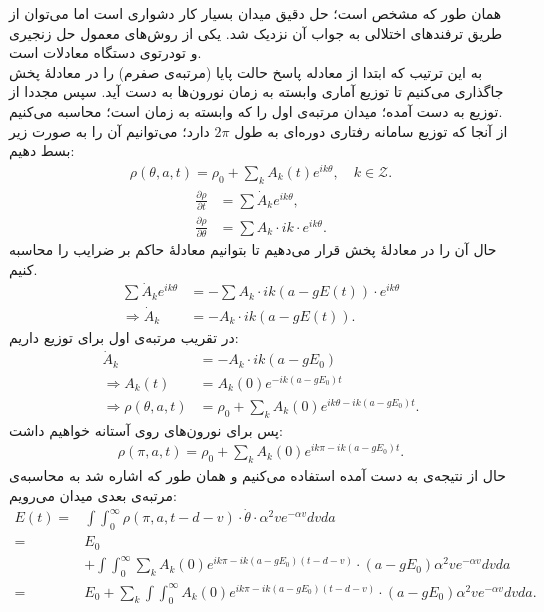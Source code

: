 همان طور که مشخص است؛ حل دقیق میدان بسیار کار دشواری است اما می‌توان از طریق ترفندهای اختلالی به جواب آن نزدیک شد. یکی از روش‌های معمول حل زنجیری و تودرتوی دستگاه معادلات است. \\
به این ترتیب که ابتدا از معادله  پاسخ حالت پایا (مرتبه‌ی صفرم) را در معادلهٔ پخش جاگذاری می‌کنیم تا توزیع آماری وابسته به زمان نورون‌ها به دست آید. سپس مجددا از توزیع به دست آمده؛ میدان مرتبه‌ی اول را که وابسته به زمان است؛ محاسبه می‌کنیم.\\
از آنجا که توزیع سامانه‌ رفتاری دوره‌ای به طول $2\pi$ دارد؛ می‌توانیم آن را به صورت زیر بسط دهیم:
\begin{align}
	\rho(\theta, a, t) = \rho_0 + \sum_k A_k(t) e^{ik\theta}, \quad k \in \mathcal{Z}.
\end{align}
\begin{align}
	\frac{\partial \rho}{\partial t} &= \sum \dot A_k e^{ik\theta} ,\\
	\frac{\partial \rho}{\partial \theta} &= \sum A_k \cdot ik \cdot e^{ik\theta}.
\end{align}
حال آن را در معادلهٔ پخش قرار می‌دهیم تا بتوانیم معادلهٔ حاکم بر ضرایب را محاسبه کنیم.
\begin{align}
	\sum \dot A_k e^{ik\theta} &= - \sum A_k \cdot ik(a - gE(t)) \cdot e^{ik\theta}\\
	\Rightarrow \dot A_k &= - A_k \cdot ik(a - gE(t)) .
\end{align}
در تقریب مرتبه‌ی اول برای توزیع داریم:
\begin{align}
	\dot A_k &= - A_k \cdot ik(a - g E_0)\\
	\Rightarrow A_k(t) &= A_k(0) e^{- ik(a-gE_0)t}\\
	\Rightarrow \rho(\theta, a, t) &= \rho_0 + \sum_k A_k(0) e^{ik\theta - ik(a - gE_0)t} .
\end{align}
پس برای نورون‌های روی آستانه خواهیم داشت:
\begin{align}
	\rho(\pi, a, t) = \rho_0 + \sum_k A_k(0) e^{ik\pi - ik(a - gE_0)t} .
\end{align}
حال از نتیجه‌ی به دست آمده استفاده می‌کنیم و همان طور که اشاره شد به محاسبه‌ی مرتبه‌ی بعدی میدان می‌رویم:
\begin{align}
	E(t) =& \int \int_{0}^{\infty} \rho(\pi, a, t-d-v)\cdot \dot \theta \cdot \alpha^2 ve^{-\alpha v} dv da \label{eq:perturbed_field}\\
	=& E_0\\
	&+ \int \int_{0}^{\infty} \sum_k A_k(0) e^{ik\pi - ik(a - gE_0)(t-d - v)} \cdot (a - gE_0) \alpha^2 ve^{-\alpha v} dv da \\
	=& E_0 + \sum_k \int \int_{0}^{\infty} A_k(0) e^{ik\pi - ik(a - gE_0)(t-d - v)} \cdot (a - gE_0) \alpha^2 ve^{-\alpha v} dv da.
\end{align}
